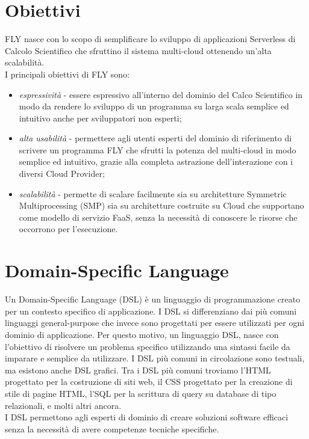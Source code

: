 \section{Obiettivi}
FLY nasce con lo scopo di semplificare lo sviluppo di applicazioni Serverless di Calcolo Scientifico che sfruttino il sistema multi-cloud ottenendo un'alta scalabilità. \\
I principali obiettivi di FLY sono:
\begin{itemize}
    \item \textit{espressività} - essere espressivo all'interno del dominio del Calco Scientifico in modo da rendere lo sviluppo di un programma su larga scala semplice ed intuitivo anche per sviluppatori non esperti;
    \item \textit{alta usabilità} - permettere agli utenti esperti del dominio di riferimento di scrivere un programma FLY che sfrutti la potenza del multi-cloud in modo semplice ed intuitivo, grazie alla completa astrazione dell'interazione con i diversi Cloud Provider;    
    \item \textit{scalabilità} - permette di scalare facilmente sia su architetture Symmetric Multiprocessing (SMP) sia su architetture costruite su Cloud che supportano come modello di servizio FaaS, senza la necessità di conoscere le risorse che occorrono per l'esecuzione.
\end{itemize}

\section{Domain-Specific Language}
Un Domain-Specific Language (DSL) è un linguaggio di programmazione creato per un contesto specifico di applicazione. I DSL si differenziano dai più comuni linguaggi general-purpose che invece sono progettati per essere utilizzati per ogni dominio di applicazione. Per questo motivo, un linguaggio DSL, nasce con l'obiettivo di risolvere un problema specifico utilizzando una sintassi facile da imparare e semplice da utilizzare. I DSL più comuni in circolazione sono testuali, ma esistono anche DSL grafici. Tra i DSL più comuni troviamo l'HTML progettato per la costruzione di siti web, il CSS progettato per la creazione di stile di pagine HTML, l'SQL per la scrittura di query su database di tipo relazionali, e molti altri ancora. \\
I DSL permettono agli esperti di dominio di creare soluzioni software efficaci senza la necessità di avere competenze tecniche specifiche. 

